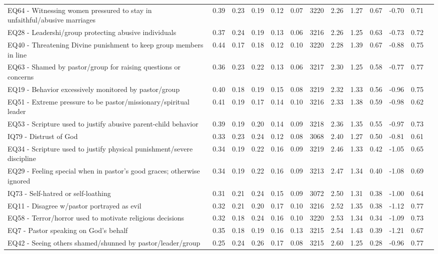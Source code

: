 \documentclass[
  letterpaper,
  DIV=11,
  numbers=noendperiod]{scrreport}
\begin{document}
\begin{longtable}[t]{>{\raggedright\arraybackslash}p{2cm}cccccccccccc}
EQ64 - Witnessing women pressured to stay in unfaithful/abusive marriages & 0.39 & 0.23 & 0.19 & 0.12 & 0.07 & 3220 & 2.26 & 1.27 & 0.67 & -0.70 & 0.71 & \\
\addlinespace
EQ28 - Leadershi/group protecting abusive individuals & 0.37 & 0.24 & 0.19 & 0.13 & 0.06 & 3216 & 2.26 & 1.25 & 0.63 & -0.73 & 0.72 & \\
EQ40 - Threatening Divine punishment to keep group members in line & 0.44 & 0.17 & 0.18 & 0.12 & 0.10 & 3220 & 2.28 & 1.39 & 0.67 & -0.88 & 0.75 & \\
EQ63 - Shamed by pastor/group for raising questions or concerns & 0.36 & 0.23 & 0.22 & 0.13 & 0.06 & 3217 & 2.30 & 1.25 & 0.58 & -0.77 & 0.77 & \\
EQ19 - Behavior excessively monitored by pastor/group & 0.40 & 0.18 & 0.19 & 0.15 & 0.08 & 3219 & 2.32 & 1.33 & 0.56 & -0.96 & 0.75 & \\
EQ51 - Extreme pressure to be pastor/missionary/spiritual leader & 0.41 & 0.19 & 0.17 & 0.14 & 0.10 & 3216 & 2.33 & 1.38 & 0.59 & -0.98 & 0.62 & \\
\addlinespace
EQ53 - Scripture used to justify abusive parent-child behavior & 0.39 & 0.19 & 0.20 & 0.14 & 0.09 & 3218 & 2.36 & 1.35 & 0.55 & -0.97 & 0.73 & \\
IQ79 - Distrust of God & 0.33 & 0.23 & 0.24 & 0.12 & 0.08 & 3068 & 2.40 & 1.27 & 0.50 & -0.81 & 0.61 & \\
EQ34 - Scripture used to justify physical punishment/severe discipline & 0.34 & 0.19 & 0.22 & 0.16 & 0.09 & 3219 & 2.46 & 1.33 & 0.42 & -1.05 & 0.65 & \\
EQ29 - Feeling special when in pastor’s good graces; otherwise ignored & 0.34 & 0.19 & 0.22 & 0.16 & 0.09 & 3213 & 2.47 & 1.34 & 0.40 & -1.08 & 0.69 & \\
IQ73 - Self-hatred or self-loathing & 0.31 & 0.21 & 0.24 & 0.15 & 0.09 & 3072 & 2.50 & 1.31 & 0.38 & -1.00 & 0.64 & \\
\addlinespace
EQ11 - Disagree w/pastor portrayed as evil & 0.32 & 0.21 & 0.20 & 0.17 & 0.10 & 3216 & 2.52 & 1.35 & 0.38 & -1.12 & 0.77 & \\
EQ58 - Terror/horror used to motivate religious decisions & 0.32 & 0.18 & 0.24 & 0.16 & 0.10 & 3220 & 2.53 & 1.34 & 0.34 & -1.09 & 0.73 & \\
EQ7 - Pastor speaking on God's behalf & 0.35 & 0.18 & 0.19 & 0.16 & 0.13 & 3215 & 2.54 & 1.43 & 0.39 & -1.21 & 0.67 & \\
EQ42 - Seeing others shamed/shunned by pastor/leader/group & 0.25 & 0.24 & 0.26 & 0.17 & 0.08 & 3215 & 2.60 & 1.25 & 0.28 & -0.96 & 0.77 & \\

\end{longtable}
\end{document}
